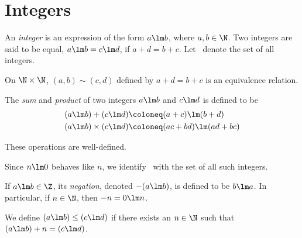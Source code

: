 \section{Integers} \label{sec:Z}
\begin{definition}
    An \emph{integer} is an expression of the form $a \lm b$, where
    $a, b \in \N$.
    Two integers are said to be equal, $a \lm b = c \lm d$, if
    $a + d = b + c$.
    Let \Z\ denote the set of all integers.
\end{definition}
\begin{exercise}
    On $\N \times \N$, $(a, b) \sim (c, d)$ defined by $a + d = b + c$
    is an equivalence relation.
\end{exercise}

\begin{definition}
    The \emph{sum} and \emph{product} of two integers $a \lm b$ and
    $c \lm d$ is defined to be \begin{align*}
        (a \lm b) + (c \lm d) &\coloneq (a + c) \lm (b + d) \\
        (a \lm b) \times (c \lm d) &\coloneq (ac + bd) \lm (ad + bc)
    \end{align*}
\end{definition}

\begin{proposition}
    These operations are well-defined.
\end{proposition}
Since $n \lm 0$ behaves like $n$, we identify \N\ with the set of all such
integers.
\begin{definition}
    If $a \lm b \in \Z$, its \emph{negation}, denoted $-(a \lm b)$, is
    defined to be $b \lm a$.
    In particular, if $n \in \N$, then $-n = 0 \lm n$.
\end{definition}
\begin{definition}
    We define $(a \lm b) \le (c \lm d)$ if there exists an $n \in \N$ such
    that $(a \lm b) + n = (c \lm d)$.
\end{definition}

\begin{lemma}[Trichotomy] \label{thm:Z:trichotomy}
    
\end{lemma}

